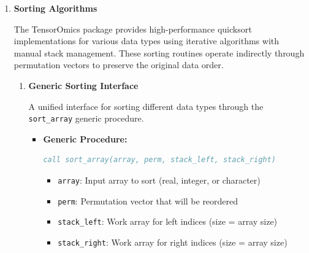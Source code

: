 \documentclass[11pt]{article}
\begin{document}
\begin{enumerate}
\begin{itemize}
	      	\item Memory usage proportional to number of elements + overhead
	      	      
	      	\item Resizing operations are O(n) but amortized over many insertions
	      \end{itemize}
	      
	\item \textbf{Sorting Algorithms}
	      
	      The TensorOmics package provides high-performance quicksort implementations
	      for various data types using iterative algorithms with manual stack management.
	      These sorting routines operate indirectly through permutation vectors to
	      preserve the original data order.
	      
	      \begin{enumerate}
	      	\item \textbf{Generic Sorting Interface}
	      	      
	      	      A unified interface for sorting different data types through the \texttt{sort\_array}
	      	      generic procedure.
	      	      
	      	      \begin{itemize}
	      	      	\item \textbf{Generic Procedure:}
	      	      	      \begin{lstlisting}[language=Fortran]
call sort_array(array, perm, stack_left, stack_right)
	      	      	      \end{lstlisting}
	      	      	      \begin{itemize}
	      	      	      	\item \texttt{array}: Input array to sort (real, integer, or
	      	      	      	      character)
	      	      	      	      
	      	      	      	\item \texttt{perm}: Permutation vector that will be reordered
	      	      	      	      
	      	      	      	\item \texttt{stack\_left}: Work array for left indices (size =
	      	      	      	      array size)
	      	      	      	      
	      	      	      	\item \texttt{stack\_right}: Work array for right indices (size
	      	      	      	      = array size)
	      	      	      \end{itemize}
	      	      	      

\end{itemize}
\end{enumerate}
\end{enumerate}
\end{document}
